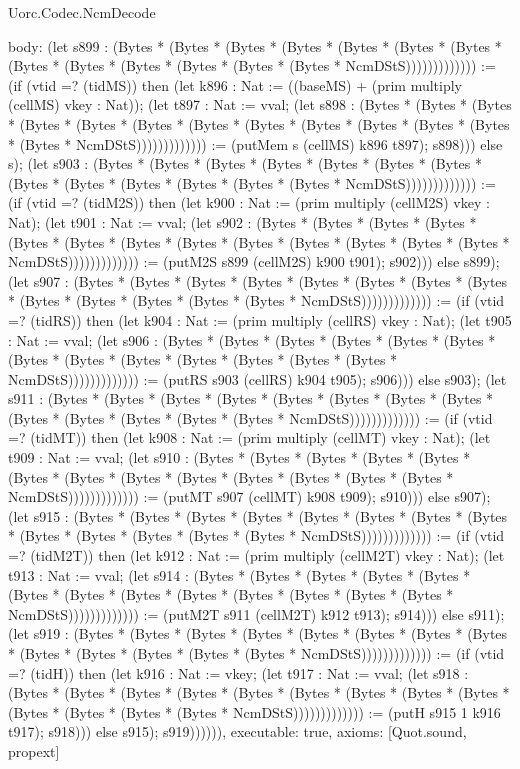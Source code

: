 \begin{lexlean}{Uorc.Codec.NcmDecode}
\begin{semanticmodule}
{  body: (let s899 : (Bytes * (Bytes * (Bytes * (Bytes * (Bytes * (Bytes * (Bytes * (Bytes * (Bytes * (Bytes * (Bytes * (Bytes * (Bytes * NcmDStS))))))))))))) := (if (vtid =? (tidMS)) then (let k896 : Nat := ((baseMS) + (prim multiply (cellMS) vkey : Nat)); (let t897 : Nat := vval; (let s898 : (Bytes * (Bytes * (Bytes * (Bytes * (Bytes * (Bytes * (Bytes * (Bytes * (Bytes * (Bytes * (Bytes * (Bytes * (Bytes * NcmDStS))))))))))))) := (putMem s (cellMS) k896 t897); s898))) else s); (let s903 : (Bytes * (Bytes * (Bytes * (Bytes * (Bytes * (Bytes * (Bytes * (Bytes * (Bytes * (Bytes * (Bytes * (Bytes * (Bytes * NcmDStS))))))))))))) := (if (vtid =? (tidM2S)) then (let k900 : Nat := (prim multiply (cellM2S) vkey : Nat); (let t901 : Nat := vval; (let s902 : (Bytes * (Bytes * (Bytes * (Bytes * (Bytes * (Bytes * (Bytes * (Bytes * (Bytes * (Bytes * (Bytes * (Bytes * (Bytes * NcmDStS))))))))))))) := (putM2S s899 (cellM2S) k900 t901); s902))) else s899); (let s907 : (Bytes * (Bytes * (Bytes * (Bytes * (Bytes * (Bytes * (Bytes * (Bytes * (Bytes * (Bytes * (Bytes * (Bytes * (Bytes * NcmDStS))))))))))))) := (if (vtid =? (tidRS)) then (let k904 : Nat := (prim multiply (cellRS) vkey : Nat); (let t905 : Nat := vval; (let s906 : (Bytes * (Bytes * (Bytes * (Bytes * (Bytes * (Bytes * (Bytes * (Bytes * (Bytes * (Bytes * (Bytes * (Bytes * (Bytes * NcmDStS))))))))))))) := (putRS s903 (cellRS) k904 t905); s906))) else s903); (let s911 : (Bytes * (Bytes * (Bytes * (Bytes * (Bytes * (Bytes * (Bytes * (Bytes * (Bytes * (Bytes * (Bytes * (Bytes * (Bytes * NcmDStS))))))))))))) := (if (vtid =? (tidMT)) then (let k908 : Nat := (prim multiply (cellMT) vkey : Nat); (let t909 : Nat := vval; (let s910 : (Bytes * (Bytes * (Bytes * (Bytes * (Bytes * (Bytes * (Bytes * (Bytes * (Bytes * (Bytes * (Bytes * (Bytes * (Bytes * NcmDStS))))))))))))) := (putMT s907 (cellMT) k908 t909); s910))) else s907); (let s915 : (Bytes * (Bytes * (Bytes * (Bytes * (Bytes * (Bytes * (Bytes * (Bytes * (Bytes * (Bytes * (Bytes * (Bytes * (Bytes * NcmDStS))))))))))))) := (if (vtid =? (tidM2T)) then (let k912 : Nat := (prim multiply (cellM2T) vkey : Nat); (let t913 : Nat := vval; (let s914 : (Bytes * (Bytes * (Bytes * (Bytes * (Bytes * (Bytes * (Bytes * (Bytes * (Bytes * (Bytes * (Bytes * (Bytes * (Bytes * NcmDStS))))))))))))) := (putM2T s911 (cellM2T) k912 t913); s914))) else s911); (let s919 : (Bytes * (Bytes * (Bytes * (Bytes * (Bytes * (Bytes * (Bytes * (Bytes * (Bytes * (Bytes * (Bytes * (Bytes * (Bytes * NcmDStS))))))))))))) := (if (vtid =? (tidH)) then (let k916 : Nat := vkey; (let t917 : Nat := vval; (let s918 : (Bytes * (Bytes * (Bytes * (Bytes * (Bytes * (Bytes * (Bytes * (Bytes * (Bytes * (Bytes * (Bytes * (Bytes * (Bytes * NcmDStS))))))))))))) := (putH s915 1 k916 t917); s918))) else s915); s919)))))),
  executable: true,
  axioms: [Quot.sound, propext]
}


\end{semanticmodule}
\end{lexlean}
